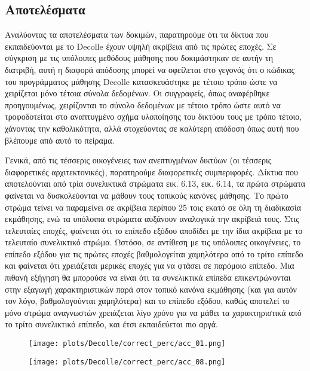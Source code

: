 \documentclass[12pt]{report}
\begin{document}
\subsection{Αποτελέσματα}

Αναλύοντας τα αποτελέσματα των δοκιμών, παρατηρούμε ότι τα δίκτυα που εκπαιδεύονται με το \textlatin{Decolle} έχουν υψηλή ακρίβεια από τις πρώτες εποχές. Σε σύγκριση με τις υπόλοιπες μεθόδους μάθησης που δοκιμάστηκαν σε αυτήν τη διατριβή, αυτή η διαφορά απόδοσης μπορεί να οφείλεται στο γεγονός ότι ο κώδικας του προγράμματος μάθησης \textlatin{Decolle} κατασκευάστηκε με τέτοιο τρόπο ώστε να χειρίζεται μόνο τέτοια σύνολα δεδομένων. Οι συγγραφείς, όπως αναφέρθηκε προηγουμένως, χειρίζονται το σύνολο δεδομένων με τέτοιο τρόπο ώστε αυτό να τροφοδοτείται στο αναπτυγμένο σχήμα υλοποίησης του δικτύου τους με τρόπο τέτοιο, χάνοντας την καθολικότητα, αλλά στοχεύοντας σε καλύτερη απόδοση όπως αυτή που βλέπουμε από αυτό το πείραμα.

Γενικά, από τις τέσσερις οικογένειες των ανεπτυγμένων δικτύων (οι τέσσερις διαφορετικές αρχιτεκτονικές), παρατηρούμε διαφορετικές συμπεριφορές. Δίκτυα που αποτελούνται από τρία συνελικτικά στρώματα εικ. 6.13, εικ. 6.14, τα πρώτα στρώματα φαίνεται να δυσκολεύονται να μάθουν τους τοπικούς κανόνες μάθησης. Το πρώτο στρώμα τείνει να παραμείνει σε ακρίβεια περίπου 25 τοις εκατό σε όλη τη διαδικασία εκμάθησης, ενώ τα υπόλοιπα στρώματα αυξάνουν αναλογικά την ακρίβειά τους. Στις τελευταίες εποχές, φαίνεται ότι το επίπεδο εξόδου αποδίδει με την ίδια ακρίβεια με το τελευταίο συνελικτικό στρώμα. Ωστόσο, σε αντίθεση με τις υπόλοιπες οικογένειες, το επίπεδο εξόδου για τις πρώτες εποχές βαθμολογείται χαμηλότερα από το τρίτο επίπεδο και φαίνεται ότι χρειάζεται μερικές εποχές για να φτάσει σε παρόμοιο επίπεδο. Μια πιθανή εξήγηση θα μπορούσε να είναι ότι τα συνελικτικά επίπεδα επικεντρώνονται στην εξαγωγή χαρακτηριστικών παρά στον τοπικό κανόνα εκμάθησης (και για αυτόν τον λόγο, βαθμολογούνται χαμηλότερα) και το επίπεδο εξόδου, καθώς αποτελεί το μόνο στρώμα αναγνωστών χρειάζεται λίγο χρόνο για να μάθει τα χαρακτηριστικά από το τρίτο συνελικτικό επίπεδο, και έτσι εκπαιδεύεται πιο αργά.

\begin{figure}
\centering
\begin{minipage}{.4\textwidth}
  \centering
  \texttt{[image: plots/Decolle/correct\_perc/acc\_01.png]}
  \label{fig:test1}
\end{minipage}
\begin{minipage}{.4\textwidth}
  \centering
  \texttt{[image: plots/Decolle/correct\_perc/acc\_08.png]}
  \label{fig:test2}
\end{minipage}
\end{figure}
\end{document}
